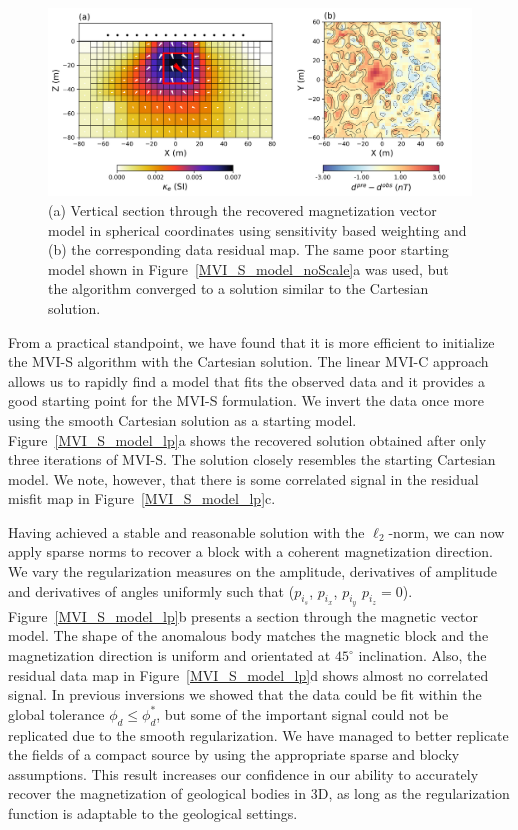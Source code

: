 \documentclass[paper]{geophysics}
\begin{document}
\begin{figure}[p!]
\includegraphics[width=\columnwidth]{Figures/Figure6.png}
\caption{(a) Vertical section through the recovered magnetization vector model in spherical coordinates using sensitivity based weighting and (b) the corresponding data residual map. The same poor starting model shown in Figure~\ref{MVI_S_model_noScale}a was used, but the algorithm converged to a solution similar to the Cartesian solution.}
\label{MVI_S_model}
\end{figure}

From a practical standpoint, we have found that it is more efficient to initialize the MVI-S algorithm with the Cartesian solution. The linear MVI-C approach allows us to rapidly find a model that fits the observed data and it provides a good starting point for the MVI-S formulation. We invert the data once more using the smooth Cartesian solution as a starting model. Figure~\ref{MVI_S_model_lp}a shows the recovered solution obtained after only three iterations of MVI-S. The solution closely resembles the starting Cartesian model. We note, however, that there is some correlated signal in the residual misfit map in Figure~\ref{MVI_S_model_lp}c.

Having achieved a stable and reasonable solution with the $\ell_2$-norm, we can now apply sparse norms to recover a block with a coherent magnetization direction.
We vary the regularization measures on the amplitude, derivatives of amplitude and derivatives of angles uniformly such that ($p_{i_s}$, $p_{i_x}$, $p_{i_y}$ $p_{i_z} = 0$).
Figure~\ref{MVI_S_model_lp}b presents a section through the magnetic vector model. The shape of the anomalous body matches the magnetic block and the magnetization direction is uniform and orientated at $45^\circ$ inclination. Also, the residual data map in Figure~\ref{MVI_S_model_lp}d shows almost no correlated signal. In previous inversions we showed that the data could be fit within the global tolerance $\phi_d \leq \phi_d^*$, but some of the important signal could not be replicated due to the smooth regularization. We have managed to better replicate the fields of a compact source by using the appropriate sparse and blocky assumptions. This result increases our confidence in our ability to accurately recover the magnetization of geological bodies in 3D, as long as the regularization function is adaptable to the geological settings.
\end{document}
